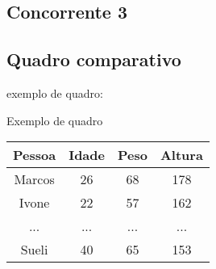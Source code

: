 \subsection{Concorrente 3}

\subsection{Quadro comparativo}
exemplo de quadro:
\begin{quadro}[htb]
	\caption{\label{quadro_exemplo}Exemplo de quadro}
	\begin{tabular}{|c|c|c|c|}
		\hline
		\textbf{Pessoa} & \textbf{Idade} & \textbf{Peso} & \textbf{Altura} \\ \hline
		Marcos & 26    & 68   & 178    \\ \hline
		Ivone  & 22    & 57   & 162    \\ \hline
		...    & ...   & ...  & ...    \\ \hline
		Sueli  & 40    & 65   & 153    \\ \hline
	\end{tabular}
\end{quadro}
